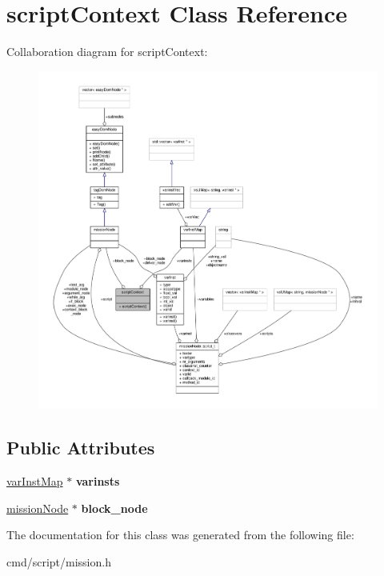 \hypertarget{classscriptContext}{}\section{script\+Context Class Reference}
\label{classscriptContext}


Collaboration diagram for script\+Context\+:
\nopagebreak
\begin{figure}[H]
\begin{center}
\leavevmode
\includegraphics[width=350pt]{dd/d35/classscriptContext__coll__graph}
\end{center}
\end{figure}
\subsection*{Public Attributes}
\begin{DoxyCompactItemize}
\item 
\hyperlink{classvarInstMap}{var\+Inst\+Map} $\ast$ {\bfseries varinsts}\hypertarget{classscriptContext_a82c0434edcb08ef74ea265be0bc9f5cb}{}\label{classscriptContext_a82c0434edcb08ef74ea265be0bc9f5cb}

\item 
\hyperlink{classmissionNode}{mission\+Node} $\ast$ {\bfseries block\+\_\+node}\hypertarget{classscriptContext_a6ab407ed0682fa24cd2e65b5c9285ea4}{}\label{classscriptContext_a6ab407ed0682fa24cd2e65b5c9285ea4}

\end{DoxyCompactItemize}


The documentation for this class was generated from the following file\+:\begin{DoxyCompactItemize}
\item 
cmd/script/mission.\+h\end{DoxyCompactItemize}

